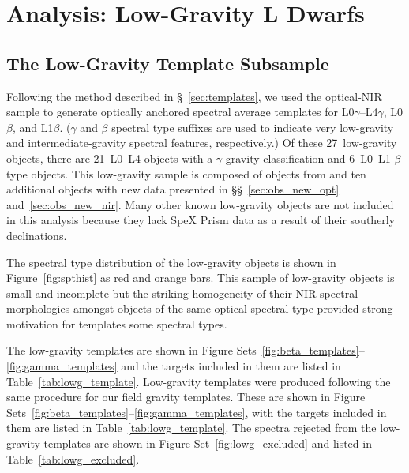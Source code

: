 \documentclass[modern,trackchanges]{aastex61}
\newcommand{\sample}{170}
\newcommand{\optLowG}{27}
\newcommand{\optBeta}{6}
\newcommand{\optGamma}{21}
\begin{document}
\section{Analysis: Low-Gravity L Dwarfs}
\label{sec:lowg}

\subsection{The Low-Gravity Template Subsample}
\label{sec:templates_lowg}

Following the method described in \S~\ref{sec:templates}, we used the optical-NIR sample to generate optically anchored spectral average templates for L0$\gamma$--L4$\gamma$, L0$\beta$, and L1$\beta$.
($\gamma$ and $\beta$ spectral type suffixes are used to indicate very low-gravity and intermediate-gravity spectral features, respectively.)
Of these \optLowG~low-gravity objects, there are \optGamma~L0--L4 objects with a $\gamma$ gravity classification and \optBeta~L0--L1 $\beta$ type objects.
This low-gravity sample is composed of objects from \citet{Cruz07,Kirkpatrick08,Cruz09_lowg} and ten additional objects with new data presented in \S\S~\ref{sec:obs_new_opt} and~\ref{sec:obs_new_nir}.
Many other known low-gravity objects are not included in this analysis because they lack SpeX Prism data as a result of their southerly declinations.

The spectral type distribution of the low-gravity objects is shown in Figure~\ref{fig:spthist} as red and orange bars.
This sample of low-gravity objects is small and incomplete\added{,} but the striking homogeneity of their NIR spectral morphologies amongst objects of the same optical spectral type provided strong motivation for  templates  some spectral types.

\replaced
{The low-gravity templates are shown in Figure Sets~\ref{fig:beta_templates}--\ref{fig:gamma_templates} and the targets included in them are listed in Table~\ref{tab:lowg_template}.}
{Low-gravity templates were produced following the same procedure for our field gravity templates.
These are shown in Figure Sets~\ref{fig:beta_templates}--\ref{fig:gamma_templates}, with the targets included in them are listed in Table~\ref{tab:lowg_template}.}
The spectra rejected from the low-gravity templates are shown in Figure Set~\ref{fig:lowg_excluded} and listed in Table~\ref{tab:lowg_excluded}.
\end{document}
